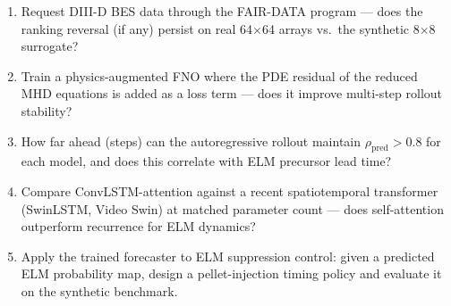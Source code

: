 \documentclass[11pt]{article}
\begin{document}
\begin{enumerate}[leftmargin=1.6em,itemsep=0.2em,topsep=0.2em,label=Q\arabic*.]
\item Request DIII-D BES data through the FAIR-DATA program --- does the ranking reversal (if any) persist on real 64$\times$64 arrays vs.\ the synthetic 8$\times$8 surrogate?
\item Train a physics-augmented FNO where the PDE residual of the reduced MHD equations is added as a loss term --- does it improve multi-step rollout stability?
\item How far ahead (steps) can the autoregressive rollout maintain $\rho_\mathrm{pred} > 0.8$ for each model, and does this correlate with ELM precursor lead time?
\item Compare ConvLSTM-attention against a recent spatiotemporal transformer (SwinLSTM, Video Swin) at matched parameter count --- does self-attention outperform recurrence for ELM dynamics?
\item Apply the trained forecaster to ELM suppression control: given a predicted ELM probability map, design a pellet-injection timing policy and evaluate it on the synthetic benchmark.
\end{enumerate}
\end{document}
